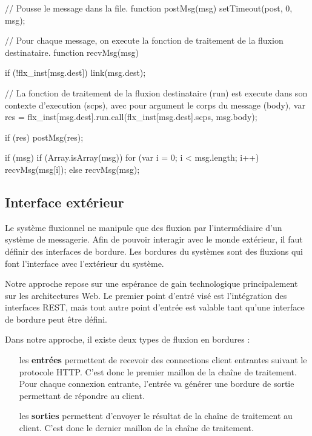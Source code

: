 \begin{code}
	// Pousse le message dans la file.
  function postMsg(msg) {
    setTimeout(post, 0, msg);
  }

  // Pour chaque message, on execute la fonction de traitement de la fluxion destinataire.
  function recvMsg(msg) {
    if (!flx_inst[msg.dest]) {
      link(msg.dest);
    }

		// La fonction de traitement de la fluxion destinataire (run) est execute dans son contexte d'execution (scps), avec pour argument le corps du message (body), 
    var res = flx_inst[msg.dest].run.call(flx_inst[msg.dest].scps, msg.body);

    if (res) {
      postMsg(res);
    }
  }

  if (msg)
    if (Array.isArray(msg)) for (var i = 0; i < msg.length; i++) {
      recvMsg(msg[i]);
    } else {
      recvMsg(msg);
    }
\end{code}


\subsection{Interface extérieur}

Le système fluxionnel ne manipule que des fluxion par l'intermédiaire d'un système de messagerie.
Afin de pouvoir interagir avec le monde extérieur, il faut définir des interfaces de bordure.
Les bordures du systèmes sont des fluxions qui font l'interface avec l'extérieur du système.

Notre approche repose sur une espérance de gain technologique principalement sur les architectures Web.
Le premier point d'entré visé est l'intégration des interfaces REST, mais tout autre point d'entrée est valable tant qu'une interface de bordure peut être défini.

Dans notre approche, il existe deux types de fluxion en bordures :

\begin{itemize}
	\item[les \textbf{entrées}]
    permettent de recevoir des connections client entrantes suivant le protocole HTTP.
    C'est donc le premier maillon de la chaîne de traitement.
    Pour chaque connexion entrante, l'entrée va générer une bordure de sortie permettant de répondre au client.
	\item[les \textbf{sorties}]
    permettent d'envoyer le résultat de la chaîne de traitement au client.
    C'est donc le dernier maillon de la chaîne de traitement.
\end{itemize}


